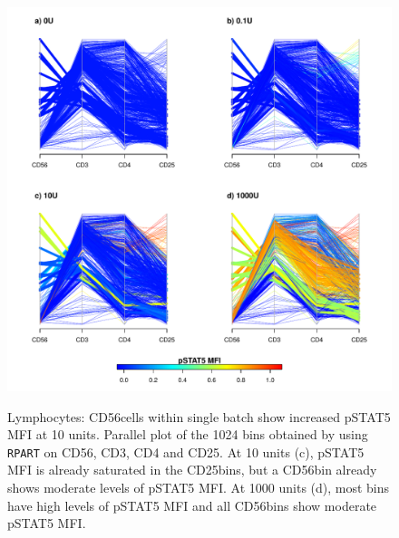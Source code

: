 \begin{figure}
\centering
\begin{minipage}{.65\textwidth}
\includegraphics[width=\linewidth]{figures/lymphocytes-KM00782Z-2012-07-23}
\end{minipage}
\begin{minipage}{.3\textwidth}
{  Lymphocytes: CD56\high cells within single batch show increased pSTAT5 MFI at 10 units. }
{ Parallel plot of the 1024 bins obtained by using \texttt{RPART} on CD56, CD3, CD4 and CD25.  At 10 units (c), pSTAT5 MFI is already saturated in the CD25\high bins, but a CD56\high bin already shows moderate levels of pSTAT5 MFI.  At 1000 units (d), most bins have high levels of pSTAT5 MFI and all CD56\positive bins show moderate pSTAT5 MFI.  }
\end{minipage}
%
\begin{minipage}{.65\textwidth}

\end{minipage}
\end{figure}
